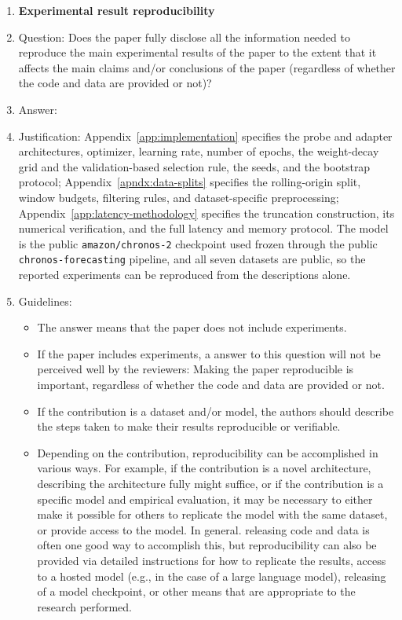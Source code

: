 \begin{enumerate}
    \item {\bf Experimental result reproducibility}
    \item[] Question: Does the paper fully disclose all the information needed to reproduce the main experimental results of the paper to the extent that it affects the main claims and/or conclusions of the paper (regardless of whether the code and data are provided or not)?
    \item[] Answer: \answerYes{}
    \item[] Justification: Appendix~\ref{app:implementation} specifies the probe and adapter architectures, optimizer, learning rate, number of epochs, the weight-decay grid and the validation-based selection rule, the seeds, and the bootstrap protocol; Appendix~\ref{apndx:data-splits} specifies the rolling-origin split, window budgets, filtering rules, and dataset-specific preprocessing; Appendix~\ref{app:latency-methodology} specifies the truncation construction, its numerical verification, and the full latency and memory protocol. The model is the public \texttt{amazon/chronos-2} checkpoint used frozen through the public \texttt{chronos-forecasting} pipeline, and all seven datasets are public, so the reported experiments can be reproduced from the descriptions alone.
    \item[] Guidelines:
    \begin{itemize}
        \item The answer \answerNA{} means that the paper does not include experiments.
        \item If the paper includes experiments, a \answerNo{} answer to this question will not be perceived well by the reviewers: Making the paper reproducible is important, regardless of whether the code and data are provided or not.
        \item If the contribution is a dataset and\slash or model, the authors should describe the steps taken to make their results reproducible or verifiable. 
        \item Depending on the contribution, reproducibility can be accomplished in various ways. For example, if the contribution is a novel architecture, describing the architecture fully might suffice, or if the contribution is a specific model and empirical evaluation, it may be necessary to either make it possible for others to replicate the model with the same dataset, or provide access to the model. In general. releasing code and data is often one good way to accomplish this, but reproducibility can also be provided via detailed instructions for how to replicate the results, access to a hosted model (e.g., in the case of a large language model), releasing of a model checkpoint, or other means that are appropriate to the research performed.

\end{itemize}
\end{enumerate}
